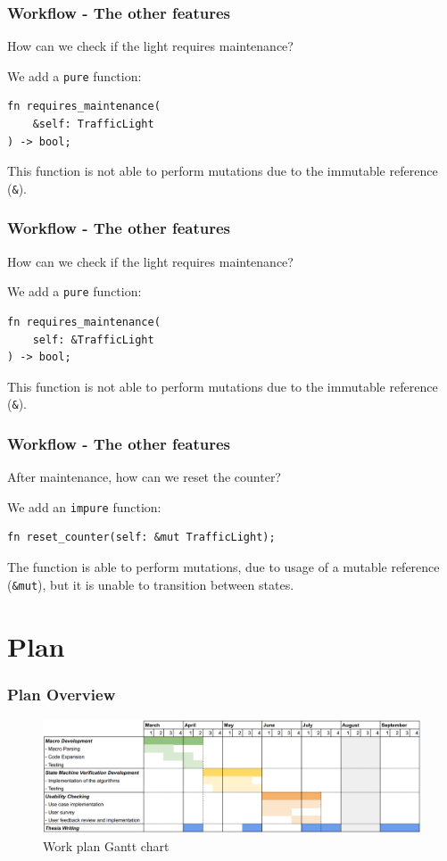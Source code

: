 \documentclass[bigger,notes]{beamer}
\begin{document}
\begin{frame}[fragile]
    \frametitle{Workflow - The other features}
    How can we check if the light requires maintenance?

    We add a \texttt{pure} function:
    \begin{listing}
    \centering
        \begin{verbatim}
fn requires_maintenance(
    &self: TrafficLight
) -> bool;
        \end{verbatim}
    \end{listing}
    This function is not able to perform mutations due to the immutable reference (\texttt{\&}).
\end{frame}

\begin{frame}[fragile]
    \frametitle{Workflow - The other features}
    How can we check if the light requires maintenance?

    We add a \texttt{pure} function:
    \begin{listing}
    \centering
        \begin{verbatim}
fn requires_maintenance(
    self: &TrafficLight
) -> bool;
        \end{verbatim}
    \end{listing}
    This function is not able to perform mutations due to the immutable reference (\texttt{\&}).
\end{frame}

\begin{frame}[fragile]
    \frametitle{Workflow - The other features}
    After maintenance, how can we reset the counter?

    We add an \texttt{impure} function:
    \begin{listing}
    \centering
        \begin{verbatim}
fn reset_counter(self: &mut TrafficLight);
        \end{verbatim}
    \end{listing}
    The function is able to perform mutations, due to usage of a mutable reference (\texttt{\&mut}),
    but it is unable to transition between states.
\end{frame}

\section{Plan}

\begin{frame}
    \frametitle{Plan Overview}

    \begin{figure}[h]
        \centering
        \includegraphics[width=\linewidth]{planning.png}
        \caption{Work plan Gantt chart}
    \end{figure}

\end{frame}
\end{document}

